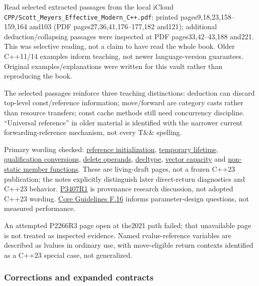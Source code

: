 \hypertarget{appendix-a103e7846d21-selected-book-passages-and-primary-checks}{}

Read selected extracted passages from the local iCloud \texttt{CPP/Scott\_Meyers\_Effective\_Modern\_C++.pdf}: printed pages9,18,23,158--159,164 and103 (PDF pages27,36,41,176--177,182 and121); additional deduction/collapsing passages were inspected at PDF pages33,42--43,188 and221. This was selective reading, not a claim to have read the whole book. Older C++11/14 examples inform teaching, not newer language-version guarantees. Original examples/explanations were written for this vault rather than reproducing the book.

The selected passages reinforce three teaching distinctions: deduction can discard top-level const/reference information; move/forward are category casts rather than resource transfers; const cache methods still need concurrency discipline. ``Universal reference'' in older material is identified with the narrower current forwarding-reference mechanism, not every T\&\& spelling.

Primary wording checked: \href{https://eel.is/c++draft/dcl.init.ref}{reference initialization}, \href{https://eel.is/c++draft/class.temporary}{temporary lifetime}, \href{https://eel.is/c++draft/conv.qual}{qualification conversions}, \href{https://eel.is/c++draft/expr.delete}{delete operands}, \href{https://eel.is/c++draft/dcl.type.decltype}{decltype}, \href{https://eel.is/c++draft/vector.capacity}{vector capacity} and \href{https://eel.is/c++draft/class.mfct.non.static}{non-static member functions}. These are living-draft pages, not a frozen C++23 publication; the notes explicitly distinguish later direct-return diagnostics and C++23 behavior. \href{https://www.open-std.org/jtc1/sc22/wg21/docs/papers/2025/p3407r1.html}{P3407R1} is provenance research discussion, not adopted C++23 wording. \href{https://isocpp.github.io/CppCoreGuidelines/CppCoreGuidelines\#f16-for-in-parameters-pass-cheaply-copied-types-by-value-and-others-by-reference-to-const}{Core Guidelines F.16} informs parameter-design questions, not measured performance.

An attempted P2266R3 page open at the2021 path failed; that unavailable page is not treated as inspected evidence. Named rvalue-reference variables are described as lvalues in ordinary use, with move-eligible return contexts identified as a C++23 special case, not generalized.

\subsubsection{Corrections and expanded contracts}\label{appendix-a103e7846d21-corrections-and-expanded-contracts}

